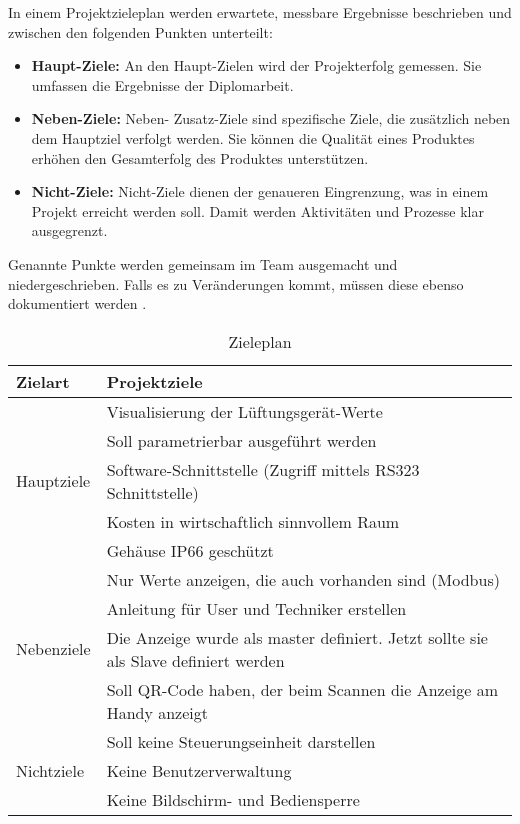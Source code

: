 In einem Projektzieleplan werden erwartete, messbare Ergebnisse beschrieben und zwischen den folgenden Punkten unterteilt:
\begin{itemize}
	\item \textbf{Haupt-Ziele:} An den Haupt-Zielen wird der  Projekterfolg gemessen. Sie umfassen die Ergebnisse der Diplomarbeit.
	\item \textbf{Neben-Ziele:} Neben- \bzw Zusatz-Ziele sind spezifische Ziele, die zusätzlich neben dem Hauptziel verfolgt werden. Sie können die Qualität eines Produktes erhöhen \bzw den Gesamterfolg des Produktes unterstützen.
	\item \textbf{Nicht-Ziele:} Nicht-Ziele dienen der genaueren Eingrenzung, was in einem Projekt erreicht werden soll. Damit werden Aktivitäten und Prozesse klar ausgegrenzt.
\end{itemize}
Genannte Punkte werden gemeinsam im Team ausgemacht und niedergeschrieben. Falls es zu Veränderungen kommt, müssen diese ebenso dokumentiert werden \cite{Diplomarbeiten-bbs:o.J.}.


\begin{table}[htpb]
	\caption{Zieleplan}
	\label{tab:ziele_plan}
	\begin{tabular}{p{} | p{}}
		\toprule
		\textbf{Zielart} & \textbf{Projektziele} \\
		\midrule
		& Visualisierung der Lüftungsgerät-Werte
		\\
		& Soll parametrierbar ausgeführt werden
		\\
		Hauptziele & Software-Schnittstelle (Zugriff mittels RS323 Schnittstelle)
		\\
		& Kosten in wirtschaftlich sinnvollem Raum
		\\
		& Gehäuse IP66 geschützt 
		\\
		\midrule
		& Nur Werte anzeigen, die auch vorhanden sind (Modbus)
		\\
		& Anleitung für User und Techniker erstellen
		\\
		Nebenziele & Die Anzeige wurde als master definiert. Jetzt sollte sie als Slave definiert werden
		\\
		& Soll QR-Code haben, der beim Scannen die Anzeige am Handy anzeigt
		\\
		\midrule
		& Soll keine Steuerungseinheit darstellen
		\\
		Nichtziele & Keine Benutzerverwaltung
		\\
		& Keine Bildschirm- und Bediensperre
		\\
		\bottomrule
	\end{tabular}
\end{table}